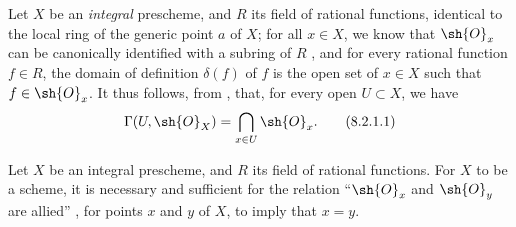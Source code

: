 \begin{env}[8.2.1]
\label{I.8.2.1}
Let $X$ be an \emph{integral} prescheme, and $R$ its field of rational functions, identical to the local ring of the generic point $a$ of $X$;
for all $x\in X$, we know that $\sh{O}_x$ can be canonically identified with a subring of $R$ , and for every rational function $f\in R$, the domain of definition $\delta(f)$ of $f$ is the open set of $x\in X$ such that
$f\in\sh{O}_x$.
It thus follows, from , that, for every open $U\subset X$, we have
\[
\label{I.8.2.1.1}
  \Gamma(U,\sh{O}_X)=\bigcap_{x\in U}\sh{O}_x.
  \tag{8.2.1.1}
\]
\end{env}

\begin{proposition}[8.2.2]
\label{I.8.2.2}
Let $X$ be an integral prescheme, and $R$ its field of rational functions. For $X$ to be a scheme, it is necessary and sufficient for the relation ``$\sh{O}_x$ and $\sh{O}_y$ are allied'' , for points $x$ and $y$ of $X$, to imply that $x=y$.
\end{proposition}

